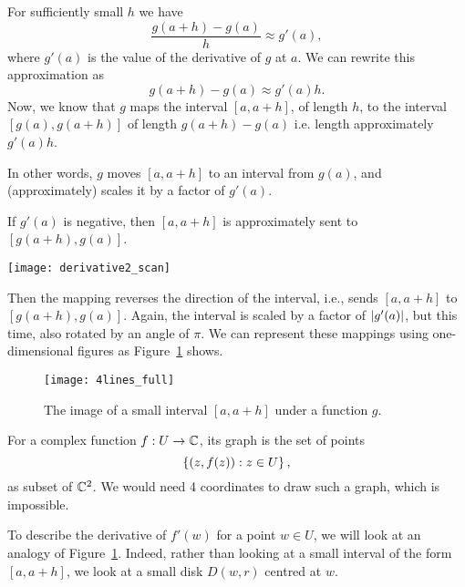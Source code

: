 For sufficiently small $h$ we have
\[
\frac{g(a+h)-g(a)}{h} \approx g'(a),
\]
where $g'(a)$ is the value of the derivative of $g$ at $a$.  We can rewrite this approximation as
\[
g(a+h)-g(a) \approx g'(a) h.
\]
Now, we know that $g$ maps the interval $[a,a+h]$, of length $h$, to the interval $[g(a),g(a+h)]$ of length $g(a+h)-g(a)$  i.e. length approximately $g'(a)h$. 

In other words, $g$ moves $[a,a+h]$ to an interval from $g(a)$, and (approximately) scales it by a factor of $g'(a)$.

If $g'(a)$ is negative, then $[a,a+h]$ is approximately sent to $[g(a+h),g(a)]$. 
\begin{center}
\texttt{[image: derivative2\_scan]}
\end{center}
Then the mapping reverses the direction of the interval, i.e., sends $[a,a+h]$ to $[g(a+h),g(a)]$.  Again, the interval is scaled by a factor of $\left| g'(a) \right|$, but this time, also rotated by an angle of $\pi$.  We can represent these mappings using one-dimensional figures as Figure~\ref{f:intervals} shows.

\begin{figure}[h]
\centering
\texttt{[image: 4lines\_full]}
\caption{The image of a small interval $[a,a+h]$ under a function $g$.}
\label{f:intervals}
\end{figure}

For a complex function $f:U \to \mathbb{C}$, its graph is the set of points
\[
\left\{ (z,f(z)): z \in U \right\},
\]
as subset of $\mathbb{C}^2$.  We would need 4 coordinates to draw such a graph, which is impossible.

To describe the derivative of $f'(w)$ for a point $w \in U$, we will look at an analogy of Figure~\ref{f:intervals}.  Indeed, rather than looking at a small interval of the form $[a,a+h]$, we look at a small disk $D(w,r)$ centred at  $w$.

